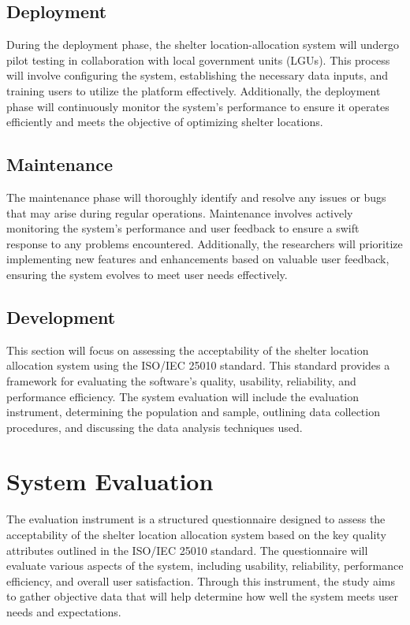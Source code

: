 \subsection{Deployment}
	During the deployment phase, the shelter location-allocation system will undergo pilot testing in collaboration with local government units (LGUs). This process will involve configuring the system, establishing the necessary data inputs, and training users to utilize the platform effectively. Additionally, the deployment phase will continuously monitor the system's performance to ensure it operates efficiently and meets the objective of optimizing shelter locations. 

\subsection{Maintenance}
	The maintenance phase will thoroughly identify and resolve any issues or bugs that may arise during regular operations. Maintenance involves actively monitoring the system's performance and user feedback to ensure a swift response to any problems encountered. Additionally, the researchers will prioritize implementing new features and enhancements based on valuable user feedback, ensuring the system evolves to meet user needs effectively.
	
\subsection{Development}
	This section will focus on assessing the acceptability of the shelter location allocation system using the ISO/IEC 25010 standard. This standard provides a framework for evaluating the software's quality, usability, reliability, and performance efficiency. The system evaluation will include the evaluation instrument, determining the population and sample, outlining data collection procedures, and discussing the data analysis techniques used.

\section{System Evaluation}
	The evaluation instrument is a structured questionnaire designed to assess the acceptability of the shelter location allocation system based on the key quality attributes outlined in the ISO/IEC 25010 standard. The questionnaire will evaluate various aspects of the system, including usability, reliability, performance efficiency, and overall user satisfaction. Through this instrument, the study aims to gather objective data that will help determine how well the system meets user needs and expectations.

